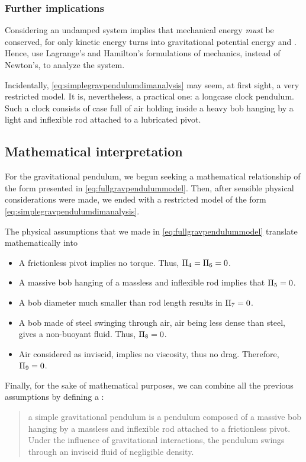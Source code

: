 \subsubsection{Further implications}
Considering an undamped system implies that mechanical energy \emph{must} be conserved, for only kinetic energy turns into gravitational potential energy and \vis. Hence, use Lagrange's and Hamilton's formulations of mechanics, instead of Newton's, to analyze the system.

Incidentally, \cref{eq:simplegravpendulumdimanalysis} may seem, at first sight, a very restricted model. It is, nevertheless, a practical one: a longcase clock pendulum. Such a clock consists of case full of air holding inside a heavy bob hanging by a light and inflexible rod attached to a lubricated pivot.


\subsection{Mathematical interpretation}\label{subsec:mathinterpretation}
For the gravitational pendulum, we begun seeking a mathematical relationship of the form presented in \cref{eq:fullgravpendulummodel}. Then, after sensible physical considerations were made, we ended with a restricted model of the form \cref{eq:simplegravpendulumdimanalysis}. 

The physical assumptions that we made in \cref{eq:fullgravpendulummodel} translate mathematically into
\begin{itemize}
%
\item A frictionless pivot implies no torque. Thus, $\Pi_4 = \Pi_6 = 0$.
%
\item A massive bob hanging of a massless and inflexible rod implies that $\Pi_5 = 0$.
%
\item A bob diameter much smaller than rod length results in $\Pi_7 = 0$.
%
\item A bob made of steel swinging through air, air being less dense than steel, gives a non-buoyant fluid. Thus, $\Pi_8 = 0$.
%
\item Air considered as inviscid, implies no viscosity, thus no drag. Therefore, $\Pi_9 = 0$.
%
\end{itemize}

Finally, for the sake of mathematical purposes, we can combine all the previous assumptions by defining a :
\begin{quote}
a simple gravitational pendulum is a pendulum composed of a massive bob hanging by a massless and inflexible rod attached to a frictionless pivot. Under the influence of gravitational interactions, the pendulum swings through an inviscid fluid of negligible density.
\end{quote}


